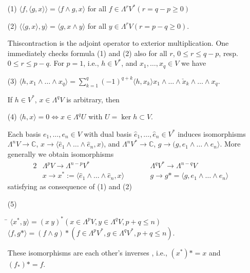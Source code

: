 \begin{itemize}
\item[(1)] $\langle f,\langle g,x\rangle\rangle=\langle f\wedge
g,x\rangle$ for all $f\in \Lambda^{r}V^{*}(r=q-p\geq 0)$

\item[(2)] $\langle\langle g,x\rangle,y\rangle=\langle g,x\wedge
y\rangle$ for all $y\in \Lambda^{r}V(r=p-q\geq 0)$.

This\pageoriginale contraction is the adjoint operator to exterior
multiplication. One immediately checks formula (1) and (2) also for
all $r$, $0\leq r\leq q-p$, resp.\@ $0\leq r\leq p-q$. For $p=1$,
i.e., $h\in V^{*}$, and $x_{1},\ldots,x_{q}\in V$ we have

\item[(3)] $\langle h,x_{1}\wedge\ldots\wedge
x_{q}\rangle=\sum\limits^{q}_{k=1}(-1)^{q+k}\langle h,x_{k}\rangle
x_{1}\wedge\ldots \wedge \check{x}_{k} \wedge\ldots\wedge x_{q}$.

If $h\in V^{*}$, $x\in \Lambda^{q}V$ is arbitrary, then

\item[(4)] $\langle h,x\rangle=0\Leftrightarrow x\in \Lambda^{q}U$ with
$U=\ker h\subset V$.


Each basis $e_{1},\ldots,e_{n}\in V$ with dual basis
$\widehat{e}_{1},\ldots,\widehat{e}_{n}\in V^{*}$ induces isomorphisms
$\Lambda^{n}V\to \mathbb{C}$,
$x\to \langle \widehat{e}_{1}\wedge\ldots\wedge \widehat{e}_{n},x)$,
and $\Lambda^{n}V^{*}\to \mathbb{C}$, $g\to (g,e_{1}\wedge\ldots\wedge
e_{n}\rangle$. More generally we obtain isomorphisms
\begin{alignat*}{2}
&\Lambda^{p}V\to \Lambda^{n-p}V^{*}
&\qquad& \Lambda^{q}V^{*}\to \Lambda^{n-q}V\\
& x\to
x^{*}:=\langle \widehat{e}_{1}\wedge\ldots\wedge\widehat{e}_{n},x\rangle
&\qquad&
g\to g*=\langle g,e_{1}\wedge\ldots\wedge e_{n}\rangle
\end{alignat*}
satisfying as consequence of (1) and (2)

\item[(5)]
\begin{tabbing}
\= $\langle x^{*},y\rangle=(x\
y)^{*}(x\in \Lambda^{p}V,y\in \Lambda^{q}V,p+q\leq n)$\\[7pt]
\> $\langle f,g*\rangle=(f\wedge
g)*(f\in \Lambda^{p}V^{*},g\in \Lambda^{q}V^{*},p+q\leq n)$.
\end{tabbing}

These isomorphisms are each other's inverses \cite[\S\ 8.5,
prop.~4]{chap2-key4}, i.e., $(x^{*})*=x$ and $(f_{*})*=f$.
\end{itemize}


